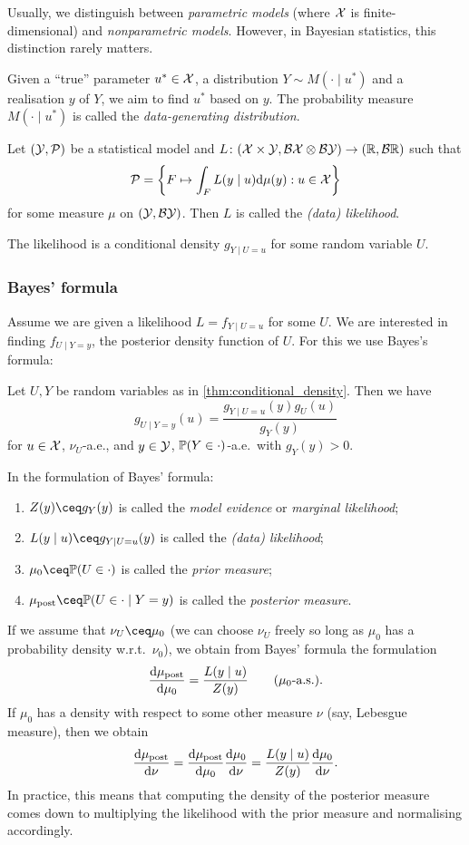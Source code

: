 Usually, we distinguish between \emph{parametric models} (where $\mathcal X$ is finite-dimensional) and \emph{nonparametric models}. However, in Bayesian statistics, this distinction rarely matters.

Given a ``true'' parameter $u^* \in \mathcal X$, a distribution $Y \sim M(\cdot \mid u^*)$ and a realisation $y$ of $Y$, we aim to find $u^*$ based on $y$. The probability measure $M(\cdot \mid u^*)$ is called the \emph{data-generating distribution}. 

\begin{definition}
	Let $(\mathcal Y, \mathcal P)$ be a statistical model and $L \colon (\mathcal X \times \mathcal Y, \mathcal B\mathcal X \otimes \mathcal B\mathcal Y) \to (\mathbb R, \mathcal B\mathbb R)$ such that
	\[
	\mathcal P = \qty{F \mapsto \int_F L(y \mid u) \dd\mu(y) : u \in \mathcal X}
	\]
	for some measure $\mu$ on $(\mathcal Y, \mathcal B\mathcal Y)$. Then $L$ is called the \emph{(data) likelihood}. 
\end{definition}
The likelihood is a conditional density $g_{Y\mid U = u}$ for some random variable $U$. 

\subsubsection{Bayes' formula}
Assume we are given a likelihood $L = f_{Y \mid U = u}$ for some $U$. We are interested in finding $f_{U \mid Y = y}$, the posterior density function of $U$. For this we use Bayes's formula:
\begin{theorem}[Bayes]
	Let $U, Y$ be random variables as in \cref{thm:conditional_density}. Then we have
	\[
	g_{U \mid Y =y}(u) = \frac{g_{Y \mid U = u}(y) g_{U}(u)}{g_Y(y)}
	\]
	for $u \in \mathcal X$, $\nu_U$-a.e., and $y \in \mathcal Y$, $\mathbb P(Y \in \cdot)$-a.e.\ with $g_Y(y) > 0$. 
\end{theorem}

\begin{definition}
	In the formulation of Bayes' formula: 
	\begin{enumerate}
		\item $Z(y) \ceq g_{Y}(y)$ is called the \emph{model evidence} or \emph{marginal likelihood};
		\item $L(y\mid u) \ceq g_{Y\mid U =u}(y)$ is called the \emph{(data) likelihood};
		\item $\mu_0 \ceq \PP(U \in \cdot)$ is called the \emph{prior measure};
		\item $\mu_\Rm{post} \ceq \PP(U \in \cdot \mid Y = y)$ is called the \emph{posterior measure}. 
	\end{enumerate}
\end{definition}

If we assume that $\nu_U \ceq \mu_0$ (we can choose $\nu_U$ freely so long as $\mu_0$ has a probability density w.r.t.\ $\nu_0$), we obtain from Bayes' formula the formulation
\[
\dv{\mu_\mathrm{post}}{\mu_0}(u) = \frac{L(y \mid u)}{Z(y)} \qquad(\mu_0\text{-a.s.}).
\] 
If $\mu_0$ has a density with respect to some other measure $\nu$ (say, Lebesgue measure), then we obtain
\[
\dv{\mu_\mathrm{post}}{\nu} = \dv{\mu_\mathrm{post}}{\mu_0} \dv{\mu_0}{\nu} = \frac{L(y \mid u)}{Z(y)} \dv{\mu_0}{\nu}. 
\]
In practice, this means that computing the density of the posterior measure comes down to multiplying the likelihood with the prior measure and normalising accordingly. 
